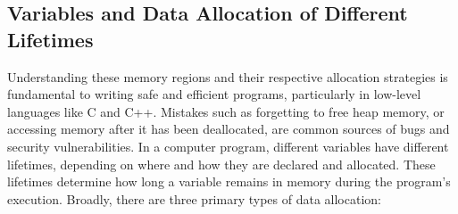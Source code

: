 \documentclass[12pt]{book}
\begin{document}
\subsection{Variables and Data Allocation of Different Lifetimes}

Understanding these memory regions and their respective allocation strategies is fundamental to writing safe and efficient programs, particularly in low-level languages like C and C++. Mistakes such as forgetting to free heap memory, or accessing memory after it has been deallocated, are common sources of bugs and security vulnerabilities. 
In a computer program, different variables have different lifetimes, depending on where and how they are declared and allocated. These lifetimes determine how long a variable remains in memory during the program's execution. Broadly, there are three primary types of data allocation:
\end{document}
